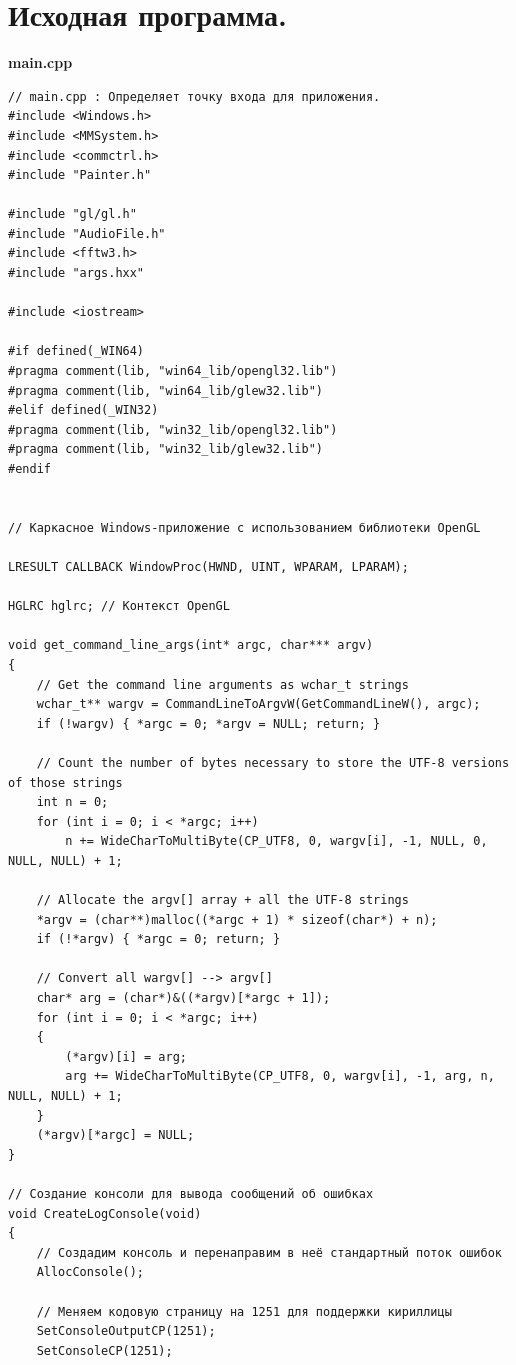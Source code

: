 \documentclass[a4paper,14pt]{extarticle}
\begin{document}
\section{Исходная программа.}
\textbf{main.cpp}
\begin{verbatim}
// main.cpp : Определяет точку входа для приложения.
#include <Windows.h>
#include <MMSystem.h>
#include <commctrl.h>
#include "Painter.h"

#include "gl/gl.h"
#include "AudioFile.h"
#include <fftw3.h>
#include "args.hxx"

#include <iostream>

#if defined(_WIN64)
#pragma comment(lib, "win64_lib/opengl32.lib")
#pragma comment(lib, "win64_lib/glew32.lib")
#elif defined(_WIN32)
#pragma comment(lib, "win32_lib/opengl32.lib")
#pragma comment(lib, "win32_lib/glew32.lib")
#endif


// Каркасное Windows-приложение с использованием библиотеки OpenGL

LRESULT CALLBACK WindowProc(HWND, UINT, WPARAM, LPARAM);

HGLRC hglrc; // Контекст OpenGL 

void get_command_line_args(int* argc, char*** argv)
{
    // Get the command line arguments as wchar_t strings
    wchar_t** wargv = CommandLineToArgvW(GetCommandLineW(), argc);
    if (!wargv) { *argc = 0; *argv = NULL; return; }

    // Count the number of bytes necessary to store the UTF-8 versions of those strings
    int n = 0;
    for (int i = 0; i < *argc; i++)
        n += WideCharToMultiByte(CP_UTF8, 0, wargv[i], -1, NULL, 0, NULL, NULL) + 1;

    // Allocate the argv[] array + all the UTF-8 strings
    *argv = (char**)malloc((*argc + 1) * sizeof(char*) + n);
    if (!*argv) { *argc = 0; return; }

    // Convert all wargv[] --> argv[]
    char* arg = (char*)&((*argv)[*argc + 1]);
    for (int i = 0; i < *argc; i++)
    {
        (*argv)[i] = arg;
        arg += WideCharToMultiByte(CP_UTF8, 0, wargv[i], -1, arg, n, NULL, NULL) + 1;
    }
    (*argv)[*argc] = NULL;
}

// Создание консоли для вывода сообщений об ошибках
void CreateLogConsole(void)
{
    // Создадим консоль и перенаправим в неё стандартный поток ошибок
    AllocConsole();
    
    // Меняем кодовую страницу на 1251 для поддержки кириллицы
    SetConsoleOutputCP(1251);
    SetConsoleCP(1251);


\end{verbatim}
\end{document}
